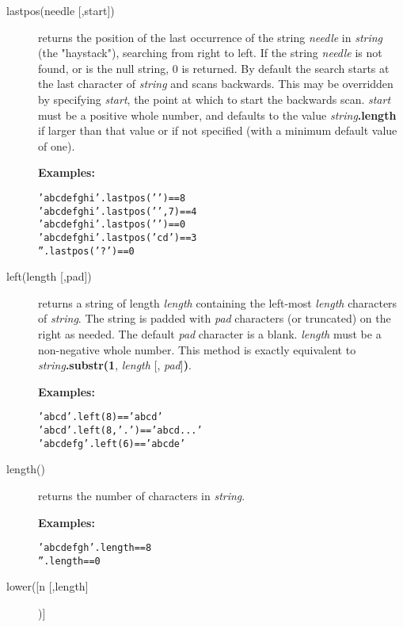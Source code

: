 \begin{description}
\item[lastpos(needle [,start{]})]\label{reflastpos}
returns the position of the last occurrence of the string
\emph{needle} in \emph{string} (the "haystack"), searching
from right to left.
If the string \emph{needle} is not found, or is the null string,
0 is returned.
By default the search starts at the last character of
\emph{string} and scans backwards.
This may be overridden by specifying \emph{start}, the point at
which to start the backwards scan.
\emph{start} must be a positive whole number, and defaults to the
value \emph{string}\textbf{.length} if larger than that
value or if not specified (with a minimum default value of one).
 
\textbf{Examples:}
\begin{alltt}
'abc def ghi'.lastpos(' ')   == 8
'abc def ghi'.lastpos(' ',7) == 4
'abcdefghi'.lastpos(' ')     == 0
'abcdefghi'.lastpos('cd')    == 3
''.lastpos('?')              == 0
\end{alltt}

\item[left(length [,pad{]})]\label{refleft}
returns a string of length \emph{length} containing the
left-most \emph{length} characters of \emph{string}.
The string is padded with \emph{pad} characters (or truncated) on
the right as needed.
The default \emph{pad} character is a blank.
\emph{length} must be a non-negative whole number.
This method is exactly equivalent to
\emph{string}\textbf{.substr(1}, \emph{length}
[, \emph{pad}]\textbf{)}.
 
\textbf{Examples:}
\begin{alltt}
'abc d'.left(8)     == 'abc d   '
'abc d'.left(8,'.') == 'abc d...'
'abc defg'.left(6)  == 'abc de'
\end{alltt}

\item[length()]\label{reflength}
returns the number of characters in \emph{string}.
 
\textbf{Examples:}
\begin{alltt}
'abcdefgh'.length == 8
''.length         == 0
\end{alltt}
\item[lower([n [,length{]}])]\label{reflower}


\end{description}
